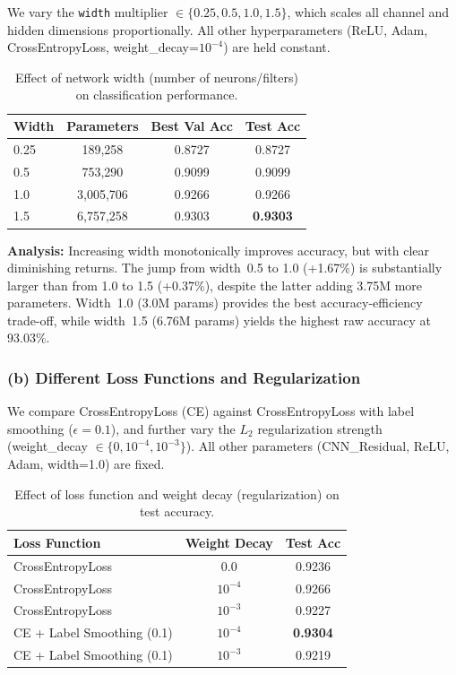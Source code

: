 \documentclass[11pt,a4paper]{article}
\begin{document}
We vary the \texttt{width} multiplier $\in \{0.25, 0.5, 1.0, 1.5\}$, which scales all channel and hidden dimensions proportionally. All other hyperparameters (ReLU, Adam, CrossEntropyLoss, weight\_decay=$10^{-4}$) are held constant.

\begin{table}[H]
\centering
\caption{Effect of network width (number of neurons/filters) on classification performance.}
\label{tab:width}
\begin{tabular}{@{}lccc@{}}
\toprule
\textbf{Width} & \textbf{Parameters} & \textbf{Best Val Acc} & \textbf{Test Acc} \\
\midrule
0.25 & 189,258  & 0.8727 & 0.8727 \\
0.5  & 753,290  & 0.9099 & 0.9099 \\
1.0  & 3,005,706 & 0.9266 & 0.9266 \\
1.5  & 6,757,258 & 0.9303 & \textbf{0.9303} \\
\bottomrule
\end{tabular}
\end{table}

\textbf{Analysis:} Increasing width monotonically improves accuracy, but with clear diminishing returns. The jump from width~0.5 to 1.0 (+1.67\%) is substantially larger than from 1.0 to 1.5 (+0.37\%), despite the latter adding 3.75M more parameters. Width~1.0 (3.0M params) provides the best accuracy-efficiency trade-off, while width~1.5 (6.76M params) yields the highest raw accuracy at 93.03\%.

\subsubsection{(b) Different Loss Functions and Regularization}

We compare CrossEntropyLoss (CE) against CrossEntropyLoss with label smoothing ($\epsilon=0.1$), and further vary the $L_2$ regularization strength (weight\_decay $\in \{0, 10^{-4}, 10^{-3}\}$). All other parameters (CNN\_Residual, ReLU, Adam, width=1.0) are fixed.

\begin{table}[H]
\centering
\caption{Effect of loss function and weight decay (regularization) on test accuracy.}
\label{tab:loss}
\begin{tabular}{@{}lcc@{}}
\toprule
\textbf{Loss Function} & \textbf{Weight Decay} & \textbf{Test Acc} \\
\midrule
CrossEntropyLoss & 0.0            & 0.9236 \\
CrossEntropyLoss & $10^{-4}$      & 0.9266 \\
CrossEntropyLoss & $10^{-3}$      & 0.9227 \\
CE + Label Smoothing (0.1) & $10^{-4}$ & \textbf{0.9304} \\
CE + Label Smoothing (0.1) & $10^{-3}$ & 0.9219 \\
\bottomrule
\end{tabular}
\end{table}
\end{document}
